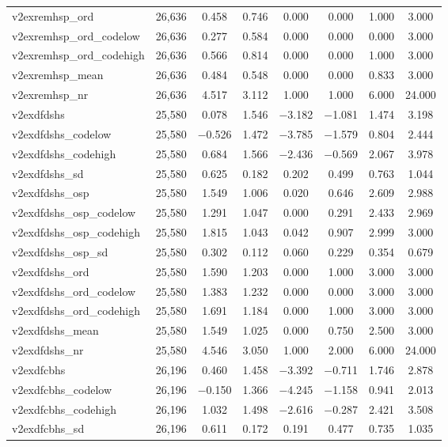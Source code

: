 \begin{table}[!htbp]
\begin{tabular}{@{\extracolsep{5pt}}lccccccc}
v2exremhsp\_ord & 26,636 & 0.458 & 0.746 & 0.000 & 0.000 & 1.000 & 3.000 \\ 
v2exremhsp\_ord\_codelow & 26,636 & 0.277 & 0.584 & 0.000 & 0.000 & 0.000 & 3.000 \\ 
v2exremhsp\_ord\_codehigh & 26,636 & 0.566 & 0.814 & 0.000 & 0.000 & 1.000 & 3.000 \\ 
v2exremhsp\_mean & 26,636 & 0.484 & 0.548 & 0.000 & 0.000 & 0.833 & 3.000 \\ 
v2exremhsp\_nr & 26,636 & 4.517 & 3.112 & 1.000 & 1.000 & 6.000 & 24.000 \\ 
v2exdfdshs & 25,580 & 0.078 & 1.546 & $-$3.182 & $-$1.081 & 1.474 & 3.198 \\ 
v2exdfdshs\_codelow & 25,580 & $-$0.526 & 1.472 & $-$3.785 & $-$1.579 & 0.804 & 2.444 \\ 
v2exdfdshs\_codehigh & 25,580 & 0.684 & 1.566 & $-$2.436 & $-$0.569 & 2.067 & 3.978 \\ 
v2exdfdshs\_sd & 25,580 & 0.625 & 0.182 & 0.202 & 0.499 & 0.763 & 1.044 \\ 
v2exdfdshs\_osp & 25,580 & 1.549 & 1.006 & 0.020 & 0.646 & 2.609 & 2.988 \\ 
v2exdfdshs\_osp\_codelow & 25,580 & 1.291 & 1.047 & 0.000 & 0.291 & 2.433 & 2.969 \\ 
v2exdfdshs\_osp\_codehigh & 25,580 & 1.815 & 1.043 & 0.042 & 0.907 & 2.999 & 3.000 \\ 
v2exdfdshs\_osp\_sd & 25,580 & 0.302 & 0.112 & 0.060 & 0.229 & 0.354 & 0.679 \\ 
v2exdfdshs\_ord & 25,580 & 1.590 & 1.203 & 0.000 & 1.000 & 3.000 & 3.000 \\ 
v2exdfdshs\_ord\_codelow & 25,580 & 1.383 & 1.232 & 0.000 & 0.000 & 3.000 & 3.000 \\ 
v2exdfdshs\_ord\_codehigh & 25,580 & 1.691 & 1.184 & 0.000 & 1.000 & 3.000 & 3.000 \\ 
v2exdfdshs\_mean & 25,580 & 1.549 & 1.025 & 0.000 & 0.750 & 2.500 & 3.000 \\ 
v2exdfdshs\_nr & 25,580 & 4.546 & 3.050 & 1.000 & 2.000 & 6.000 & 24.000 \\ 
v2exdfcbhs & 26,196 & 0.460 & 1.458 & $-$3.392 & $-$0.711 & 1.746 & 2.878 \\ 
v2exdfcbhs\_codelow & 26,196 & $-$0.150 & 1.366 & $-$4.245 & $-$1.158 & 0.941 & 2.013 \\ 
v2exdfcbhs\_codehigh & 26,196 & 1.032 & 1.498 & $-$2.616 & $-$0.287 & 2.421 & 3.508 \\ 
v2exdfcbhs\_sd & 26,196 & 0.611 & 0.172 & 0.191 & 0.477 & 0.735 & 1.035 \\ 

\end{tabular}
\end{table}
